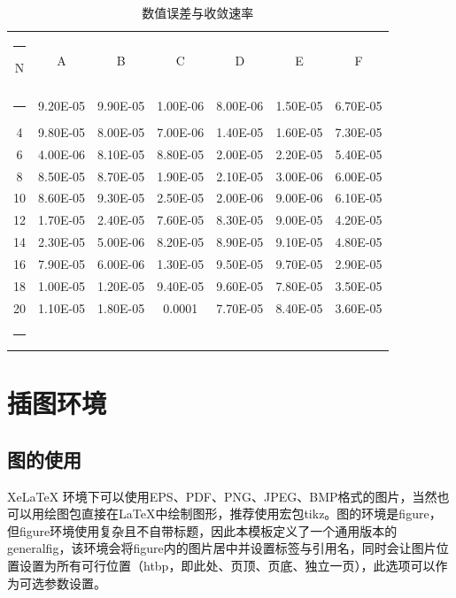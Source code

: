 \documentclass{shnuthesis}
\begin{document}
\begin{table}[htp!]
\centering
\centering
\renewcommand\arraystretch{1.2} %
\makeatletter
\def\hlinew#1{\noalign{\ifnum0=`}\fi\hrule \@height #1 \futurelet\reserved@a\@xhline}
\makeatother
\caption{数值误差与收敛速率}
\label{table2}
\begin{tabular}{||c|c|c|c|c|c|c||}
\hlinew{0.9pt}  %
N  & A       & B    & C       & D      & E       & F   \\
\hlinew{0.9pt}  %
2  & 9.20E-05 & 9.90E-05 & 1.00E-06 & 8.00E-06 & 1.50E-05 & 6.70E-05 \\
4  & 9.80E-05 & 8.00E-05 & 7.00E-06 & 1.40E-05 & 1.60E-05 & 7.30E-05 \\
6  & 4.00E-06 & 8.10E-05 & 8.80E-05 & 2.00E-05 & 2.20E-05 & 5.40E-05 \\
8  & 8.50E-05 & 8.70E-05 & 1.90E-05 & 2.10E-05 & 3.00E-06 & 6.00E-05 \\
10 & 8.60E-05 & 9.30E-05 & 2.50E-05 & 2.00E-06 & 9.00E-06 & 6.10E-05 \\
12 & 1.70E-05 & 2.40E-05 & 7.60E-05 & 8.30E-05 & 9.00E-05 & 4.20E-05 \\
14 & 2.30E-05 & 5.00E-06 & 8.20E-05 & 8.90E-05 & 9.10E-05 & 4.80E-05 \\
16 & 7.90E-05 & 6.00E-06 & 1.30E-05 & 9.50E-05 & 9.70E-05 & 2.90E-05 \\
18 & 1.00E-05 & 1.20E-05 & 9.40E-05 & 9.60E-05 & 7.80E-05 & 3.50E-05 \\
20 & 1.10E-05 & 1.80E-05 & 0.0001   & 7.70E-05 & 8.40E-05 & 3.60E-05  \\
\hlinew{0.9pt}  %
\end{tabular}
\end{table}

	


\chapter{插图环境}

\section{图的使用}
	XeLaTeX 环境下可以使用EPS、PDF、PNG、JPEG、BMP格式的图片，当然也可以用绘图包直接在\LaTeX 中绘制图形，推荐使用宏包tikz。图的环境是figure，但figure环境使用复杂且不自带标题，因此本模板定义了一个通用版本的generalfig，该环境会将figure内的图片居中并设置标签与引用名，同时会让图片位置设置为所有可行位置（htbp，即此处、页顶、页底、独立一页），此选项可以作为可选参数设置。
\end{document}

